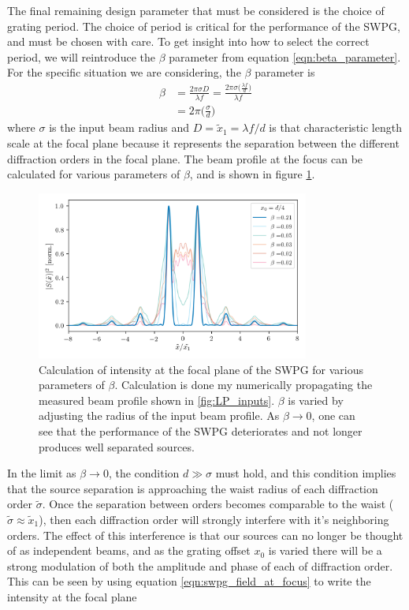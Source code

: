 The final remaining design parameter that must be considered is the choice of grating period. The choice of period is critical for the performance of the SWPG, and must be chosen with care.  To get insight into how to select the correct period, we will reintroduce the $\beta$ parameter from equation \ref{eqn:beta_parameter}.  For the specific situation we are considering, the $\beta$ parameter is
\begin{equation}
\label{eqn:beta_swpg}
	\begin{aligned}
		\beta &= \frac{2\pi \sigma D}{\lambda f} = \frac{2\pi\sigma\big(\frac{\lambda f}{d}\big)}{\lambda f}\\
		&= 2\pi\bigg(\frac{\sigma}{d}\bigg)
	\end{aligned}
\end{equation}
where $\sigma$ is the input beam radius and $D=\tilde{x}_1=\lambda f /d$ is that characteristic length scale at the focal plane because it represents the separation between the different diffraction orders in the focal plane.  The beam profile at the focus can be calculated for various parameters of $\beta$, and is shown in figure \ref{fig:intensity_vs_beta}.
\begin{figure}
	\centering
	\includegraphics[width=0.8\textwidth]{figures/Two_source/focus_intensity_beta_sigma.png}
	\caption{Calculation of intensity at the focal plane of the SWPG for various parameters of $\beta$.  Calculation is done my numerically propagating the measured beam profile shown in \ref{fig:LP_inputs}.  $\beta$ is varied by adjusting the radius of the input beam profile.  As $\beta\rightarrow0$, one can see that the performance of the SWPG deteriorates and not longer produces well separated sources.}
	\label{fig:intensity_vs_beta}
\end{figure}
In the limit as $\beta\rightarrow0$, the condition $d\gg\sigma$ must hold, and this condition implies that the source separation is approaching the waist radius of each diffraction order $\tilde{\sigma}$.  Once the separation between orders becomes comparable to the waist ($\tilde{\sigma}\approx\tilde{x}_1$), then each diffraction order will strongly interfere with it's neighboring orders.  The effect of this interference is that our sources can no longer be thought of as independent beams, and as the grating offset $x_0$ is varied there will be a strong modulation of both the amplitude and phase of each of diffraction order.  This can be seen by using equation \ref{eqn:swpg_field_at_focus} to write the intensity at the focal plane
